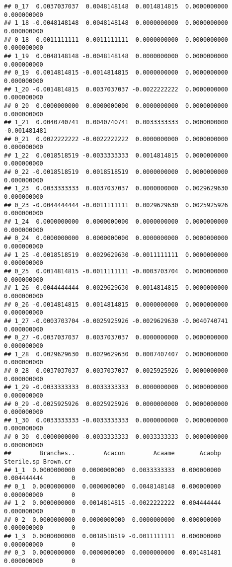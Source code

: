 \documentclass[]{article}
\begin{document}
\begin{verbatim}
## 0_17  0.0037037037  0.0048148148  0.0014814815  0.0000000000  0.000000000
## 1_18 -0.0048148148  0.0048148148  0.0000000000  0.0000000000  0.000000000
## 0_18  0.0011111111 -0.0011111111  0.0000000000  0.0000000000  0.000000000
## 1_19  0.0048148148 -0.0048148148  0.0000000000  0.0000000000  0.000000000
## 0_19  0.0014814815 -0.0014814815  0.0000000000  0.0000000000  0.000000000
## 1_20 -0.0014814815  0.0037037037 -0.0022222222  0.0000000000  0.000000000
## 0_20  0.0000000000  0.0000000000  0.0000000000  0.0000000000  0.000000000
## 1_21  0.0040740741  0.0040740741  0.0033333333  0.0000000000 -0.001481481
## 0_21  0.0022222222 -0.0022222222  0.0000000000  0.0000000000  0.000000000
## 1_22  0.0018518519 -0.0033333333  0.0014814815  0.0000000000  0.000000000
## 0_22 -0.0018518519  0.0018518519  0.0000000000  0.0000000000  0.000000000
## 1_23  0.0033333333  0.0037037037  0.0000000000  0.0029629630  0.000000000
## 0_23 -0.0044444444 -0.0011111111  0.0029629630  0.0025925926  0.000000000
## 1_24  0.0000000000  0.0000000000  0.0000000000  0.0000000000  0.000000000
## 0_24  0.0000000000  0.0000000000  0.0000000000  0.0000000000  0.000000000
## 1_25 -0.0018518519  0.0029629630 -0.0011111111  0.0000000000  0.000000000
## 0_25  0.0014814815 -0.0011111111 -0.0003703704  0.0000000000  0.000000000
## 1_26 -0.0044444444  0.0029629630  0.0014814815  0.0000000000  0.000000000
## 0_26 -0.0014814815  0.0014814815  0.0000000000  0.0000000000  0.000000000
## 1_27 -0.0003703704 -0.0025925926 -0.0029629630 -0.0040740741  0.000000000
## 0_27 -0.0037037037  0.0037037037  0.0000000000  0.0000000000  0.000000000
## 1_28  0.0029629630  0.0029629630  0.0007407407  0.0000000000  0.000000000
## 0_28  0.0037037037  0.0037037037  0.0025925926  0.0000000000  0.000000000
## 1_29 -0.0033333333  0.0033333333  0.0000000000  0.0000000000  0.000000000
## 0_29 -0.0025925926  0.0025925926  0.0000000000  0.0000000000  0.000000000
## 1_30  0.0033333333 -0.0033333333  0.0000000000  0.0000000000  0.000000000
## 0_30  0.0000000000 -0.0033333333  0.0033333333  0.0000000000  0.000000000
##        Branches..        Acacon        Acaame       Acaobp  Sterile.sp Brown.cr
## 1_1  0.0000000000  0.0000000000  0.0033333333  0.000000000 0.004444444        0
## 0_1  0.0000000000  0.0000000000  0.0048148148  0.000000000 0.000000000        0
## 1_2  0.0000000000  0.0014814815 -0.0022222222  0.004444444 0.000000000        0
## 0_2  0.0000000000  0.0000000000  0.0000000000  0.000000000 0.000000000        0
## 1_3  0.0000000000  0.0018518519 -0.0011111111  0.000000000 0.000000000        0
## 0_3  0.0000000000  0.0000000000  0.0000000000  0.001481481 0.000000000        0

\end{verbatim}
\end{document}
